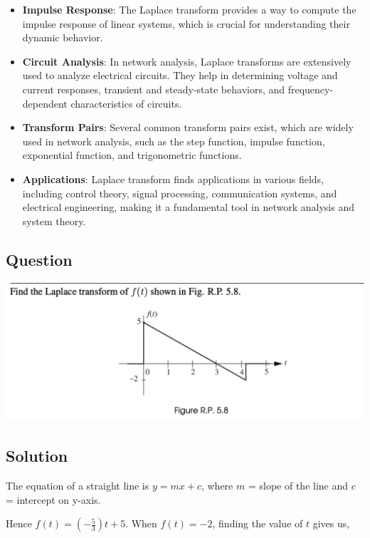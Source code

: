 \documentclass[
]{article}
\begin{document}
\begin{itemize}
\item
  \textbf{Impulse Response}: The Laplace transform provides a way to
  compute the impulse response of linear systems, which is crucial for
  understanding their dynamic behavior.
\item
  \textbf{Circuit Analysis}: In network analysis, Laplace transforms are
  extensively used to analyze electrical circuits. They help in
  determining voltage and current responses, transient and steady-state
  behaviors, and frequency-dependent characteristics of circuits.
\item
  \textbf{Transform Pairs}: Several common transform pairs exist, which
  are widely used in network analysis, such as the step function,
  impulse function, exponential function, and trigonometric functions.
\item
  \textbf{Applications}: Laplace transform finds applications in various
  fields, including control theory, signal processing, communication
  systems, and electrical engineering, making it a fundamental tool in
  network analysis and system theory.
\end{itemize}

\hypertarget{question}{%
\subsection{Question}\label{question}}

\includegraphics{question.png}

\hypertarget{solution}{%
\subsection{Solution}\label{solution}}

The equation of a straight line is \(y = mx + c\), where \(m\) = slope
of the line and \(c\) = intercept on y-axis.

Hence \(f(t) = \left(-\frac{5}{3}\right)t + 5\). When \(f(t) = -2\),
finding the value of \(t\) gives us,
\end{document}
